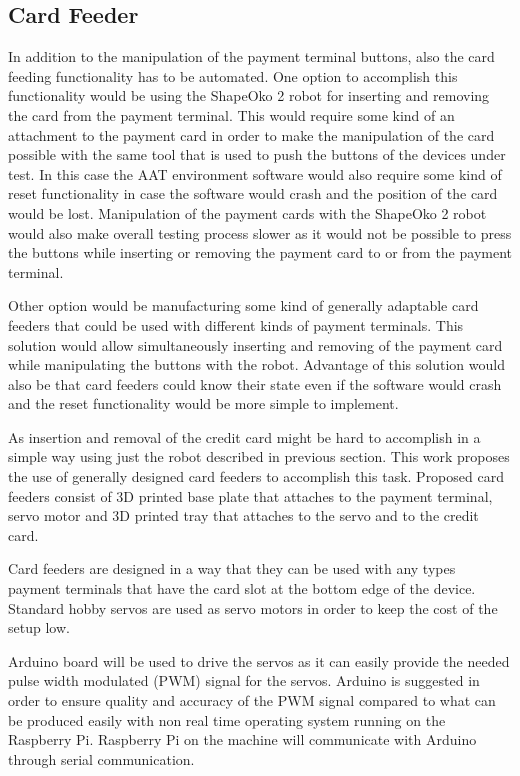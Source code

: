 \FloatBarrier
\subsection{Card Feeder}
\label{subsection:Card feeder}

In addition to the manipulation of the payment terminal buttons, also the card feeding functionality has to be automated. One option to accomplish this functionality would be using the ShapeOko 2 robot for inserting and removing the card from the payment terminal. This would require some kind of an attachment to the payment card in order to make the manipulation of the card possible with the same tool that is used to push the buttons of the devices under test. In this case the AAT environment software would also require some kind of reset functionality in case the software would crash and the position of the card would be lost. Manipulation of the payment cards with the ShapeOko 2 robot would also make overall testing process slower as it would not be possible to press the buttons while inserting or removing the payment card to or from the payment terminal.

Other option would be manufacturing some kind of generally adaptable card feeders that could be used with different kinds of payment terminals. This solution would allow simultaneously inserting and removing of the payment card while manipulating the buttons with the robot. Advantage of this solution would also be that card feeders could know their state even if the software would crash and the reset functionality would be more simple to implement.

As insertion and removal of the credit card might be hard to accomplish in a simple way using just the robot described in previous section. This work proposes the use of generally designed card feeders to accomplish this task. Proposed card feeders consist of 3D printed base plate that attaches to the payment terminal, servo motor and 3D printed tray that attaches to the servo and to the credit card.

Card feeders are designed in a way that they can be used with any types payment terminals that have the card slot at the bottom edge of the device. Standard hobby servos are used as servo motors in order to keep the cost of the setup low.

Arduino board will be used to drive the servos as it can easily provide the needed pulse width modulated (PWM) signal for the servos. Arduino is suggested in order to ensure quality and accuracy of the PWM signal compared to what can be produced easily with non real time operating system running on the Raspberry Pi. Raspberry Pi on the machine will communicate with Arduino through serial communication.


